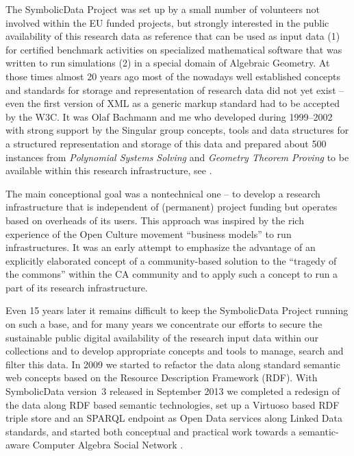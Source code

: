 \documentclass[runningheads,a4paper]{llncs}
\newcommand{\SD}{{\sc Symbo\-lic\-Data}}
\begin{document}
The {\SD} Project was set up by a small number of volunteers not involved
within the EU funded projects, but strongly interested in the public
availability of this research data as reference that can be used as input data
(1) for certified benchmark activities on specialized mathematical software
that was written to run simulations (2) in a special domain of Algebraic
Geometry. At those times almost 20 years ago most of the nowadays well
established concepts and standards for storage and representation of research
data did not yet exist -- even the first version of XML as a generic markup
standard had to be accepted by the W3C. It was Olaf Bachmann and me who
developed during 1999--2002 with strong support by the Singular group concepts,
tools and data structures for a structured representation and storage of this
data and prepared about 500 instances from \emph{Polynomial Systems Solving}
and \emph{Geometry Theorem Proving} to be available within this research
infrastructure, see \cite{Bachmann2000}.

The main conceptional goal was a nontechnical one -- to develop a research
infrastructure that is independent of (permanent) project funding but operates
based on overheads of its users. This approach was inspired by the rich
experience of the Open Culture movement ``business models'' to run
infrastructures. It was an early attempt to emphasize the advantage of an
explicitly elaborated concept of a community-based solution to the ``tragedy
of the commons'' \cite{hardin} within the CA community and to apply such a
concept to run a part of its research infrastructure.  

Even 15 years later it remains difficult to keep the {\SD} Project running on
such a base, and for many years we concentrate our efforts to secure the
sustainable public digital availability of the research input data within our
collections and to develop appropriate concepts and tools to manage, search and
filter this data.  In 2009 we started to refactor the data along standard
semantic web concepts based on the Resource Description Framework (RDF).  With
{\SD} version~3 released in September 2013 we completed a redesign of the data
along RDF based semantic technologies, set up a Virtuoso based RDF triple store
and an SPARQL endpoint as Open Data services along Linked Data standards, and
started both conceptual and practical work towards a semantic-aware Computer
Algebra Social Network \cite{cicm-14}.
\end{document}
